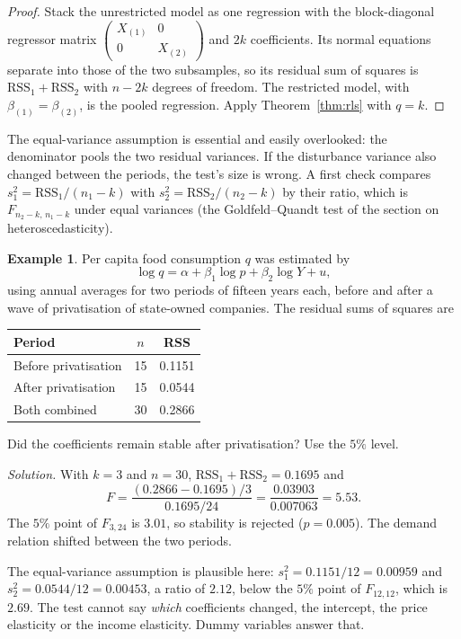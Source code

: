 \documentclass[11pt,a4paper]{article}
\numberwithin{equation}{section}
\theoremstyle{definition}
\newtheorem{exa}[thm]{Example}
\begin{document}
\begin{proof}
Stack the unrestricted model as one regression with the block-diagonal regressor matrix $\begin{pmatrix} X_{(1)} & 0 \\ 0 & X_{(2)} \end{pmatrix}$ and $2k$
coefficients. Its normal equations separate into those of the two subsamples, so its residual sum of squares is $\text{RSS}_1 + \text{RSS}_2$ with
$n - 2k$ degrees of freedom. The restricted model, with $\beta_{(1)} = \beta_{(2)}$, is the pooled regression. Apply Theorem~\ref{thm:rls} with $q = k$.
\end{proof}

The equal-variance assumption is essential and easily overlooked: the denominator pools the two residual variances. If the disturbance variance
also changed between the periods, the test's size is wrong. A first check compares $s_1^2 = \text{RSS}_1/(n_1 - k)$ with $s_2^2 = \text{RSS}_2/(n_2 - k)$ by
their ratio, which is $F_{n_2-k,\,n_1-k}$ under equal variances (the Goldfeld--Quandt test of the section on heteroscedasticity).

\begin{exa}
\label{ex:chowfood}
Per capita food consumption $q$ was estimated by
\[
\log q = \alpha + \beta_1\log p + \beta_2\log Y + u ,
\]
using annual averages for two periods of fifteen years each, before and after a wave of privatisation of state-owned companies. The residual sums
of squares are
\begin{center}
\begin{tabular}{lcc}
Period & $n$ & RSS\\\hline
Before privatisation & 15 & 0.1151\\
After privatisation & 15 & 0.0544\\
Both combined & 30 & 0.2866
\end{tabular}
\end{center}
Did the coefficients remain stable after privatisation? Use the $5\%$ level.

\emph{Solution.} With $k = 3$ and $n = 30$, $\text{RSS}_1 + \text{RSS}_2 = 0.1695$ and
\[
F = \frac{(0.2866 - 0.1695)/3}{0.1695/24} = \frac{0.03903}{0.007063} = 5.53 .
\]
The $5\%$ point of $F_{3,24}$ is $3.01$, so stability is rejected ($p = 0.005$). The demand relation shifted between the two periods.

The equal-variance assumption is plausible here: $s_1^2 = 0.1151/12 = 0.00959$ and $s_2^2 = 0.0544/12 = 0.00453$, a ratio of $2.12$, below the $5\%$ point of
$F_{12,12}$, which is $2.69$. The test cannot say \emph{which} coefficients changed, the intercept, the price elasticity or the income elasticity. Dummy
variables answer that.
\end{exa}
\end{document}
